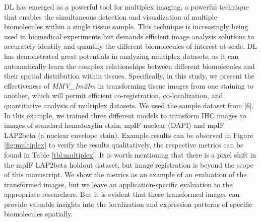 DL has emerged as a powerful tool for multiplex imaging, a powerful technique that enables the simultaneous detection and visualization of multiple biomolecules within a single tissue sample. This technique is increasingly being used in biomedical experiments but demands efficient image analysis solutions to accurately identify and quantify the different biomolecules of interest at scale. DL has demonstrated great potentials in analyzing multiplex datasets, as it can automatically learn the complex relationships between different biomolecules and their spatial distribution within tissues. Specifically, in this study, we present the effectiveness of \emph{MMV\_Im2Im} in transforming tissue images from one staining to another, which will permit efficient co-registration, co-localization, and quantitative analysis of multiplex datasets. We used the sample dataset from {[}\protect\hyperlink{ref-WwenuBHa}{6}{]}. In this example, we trained three different models to transform IHC images to images of standard hematoxylin stain, mpIF nuclear (DAPI) and mpIF LAP2beta (a nuclear envelope stain). Example results can be observed in Figure \ref{fig:multiplex} to verify the results qualitatively, the respective metrics can be found in Table \ref{tbl:multiplex}. It is worth mentioning that there is a pixel shift in the mpIF LAP2beta holdout dataset, but image registration is beyond the scope of this manuscript. We show the metrics as an example of an evaluation of the transformed images, but we leave an application-specific evaluation to the appropriate researchers. But it is evident that these transformed images can provide valuable insights into the localization and expression patterns of specific biomolecules spatially.

